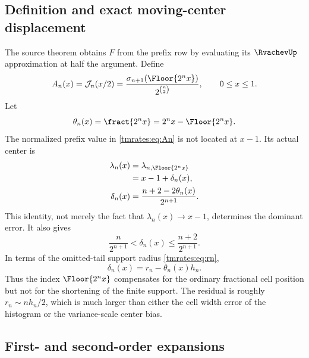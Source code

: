 \documentclass[11pt,oneside]{article}
\theoremstyle{definition}
\theoremstyle{remark}
\begin{document}
\subsection{Definition and exact moving-center displacement}

The source theorem obtains $F$ from the prefix row by evaluating its $\RvachevUp$ approximation at
half the argument.  Define
\begin{equation}
 A_n(x)=\mathcal J_n(x/2)
 =\frac{\sigma_{n+1}(\Floor{2^nx})}{2^{\binom n2}},
 \qquad 0\le x\le1.                                      \label{tmrates:eq:An}
\end{equation}
Let
\begin{equation}
 \theta_n(x)=\fract{2^nx}=2^nx-\Floor{2^nx}.        \label{tmrates:eq:theta}
\end{equation}
The normalized prefix value in \eqref{tmrates:eq:An} is not located at $x-1$.  Its actual center is
\begin{align}
 \lambda_n(x)
 &=\lambda_{n,\Floor{2^nx}} \notag\\
 &=x-1+\delta_n(x),                                        \label{tmrates:eq:lambda-drift}\\
 \delta_n(x)
 &=\frac{n+2-2\theta_n(x)}{2^{n+1}}.                       \label{tmrates:eq:delta}
\end{align}
This identity, not merely the fact that $\lambda_n(x)\to x-1$, determines the dominant error.
It also gives
\begin{equation}
 \frac{n}{2^{n+1}}<\delta_n(x)\le\frac{n+2}{2^{n+1}}.     \label{tmrates:eq:delta-range}
\end{equation}
In terms of the omitted-tail support radius \eqref{tmrates:eq:rn},
\begin{equation}
 \delta_n(x)=r_n-\theta_n(x)h_n.                           \label{tmrates:eq:delta-rn}
\end{equation}
Thus the index $\Floor{2^nx}$ compensates for the ordinary fractional cell position but
not for the shortening of the finite support.  The residual is roughly $r_n\sim nh_n/2$,
which is much larger than either the cell width error of the histogram or the variance-scale
center bias.

\subsection{First- and second-order expansions}
\end{document}
